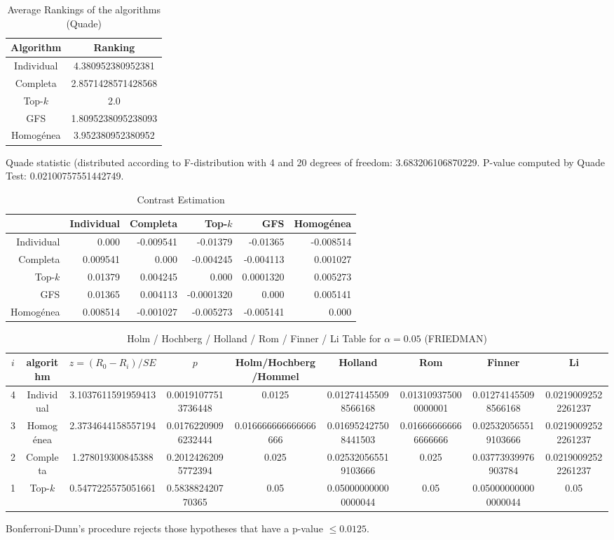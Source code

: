 \documentclass[a4paper,10pt]{article}
\begin{document}
\begin{landscape}
\newpage

\begin{table}[!htp]
\centering
\caption{Average Rankings of the algorithms (Quade)
}\begin{tabular}{c|c}
Algorithm&Ranking\\
\hline
Individual&4.380952380952381\\
Completa&2.8571428571428568\\
Top-$k$&2.0\\
GFS&1.8095238095238093\\
Homogénea&3.952380952380952\\
\end{tabular}
\end{table}
Quade statistic (distributed according to F-distribution with 4 and 20 degrees of freedom: 3.683206106870229. 
P-value computed by Quade Test: 0.02100757551442749.\newline


\newpage

\begin{table}[!htp]
\centering\tiny
\caption{Contrast Estimation}
\begin{tabular}{
|r|r|r|r|r|r|}
\hline
 &Individual&Completa&Top-$k$&GFS&Homogénea\\
\hline
Individual&0.000&-0.009541&-0.01379&-0.01365&-0.008514\\
\hline
Completa&0.009541&0.000&-0.004245&-0.004113&0.001027\\
\hline
Top-$k$&0.01379&0.004245&0.000&0.0001320&0.005273\\
\hline
GFS&0.01365&0.004113&-0.0001320&0.000&0.005141\\
\hline
Homogénea&0.008514&-0.001027&-0.005273&-0.005141&0.000\\
\hline

\end{tabular}
\end{table}

\newpage

\begin{table}[!htp]
\centering\scriptsize
\caption{Holm / Hochberg / Holland / Rom / Finner / Li Table for $\alpha=0.05$ (FRIEDMAN)}
\begin{tabular}{ccccccccc}
$i$&algorithm&$z=(R_0 - R_i)/SE$&$p$&Holm/Hochberg/Hommel&Holland&Rom&Finner&Li\\
\hline
4&Individual&3.1037611591959413&0.00191077513736448&0.0125&0.012741455098566168&0.013109375000000001&0.012741455098566168&0.02190092522261237\\
3&Homogénea&2.3734644158557194&0.01762209096232444&0.016666666666666666&0.016952427508441503&0.016666666666666666&0.025320565519103666&0.02190092522261237\\
2&Completa&1.278019300845388&0.20124262095772394&0.025&0.025320565519103666&0.025&0.03773939976903784&0.02190092522261237\\
1&Top-$k$&0.5477225575051661&0.583882420770365&0.05&0.050000000000000044&0.05&0.050000000000000044&0.05\\
\hline
\end{tabular}
\end{table}
Bonferroni-Dunn's procedure rejects those hypotheses that have a p-value $\le0.0125$.



\end{landscape}
\end{document}
